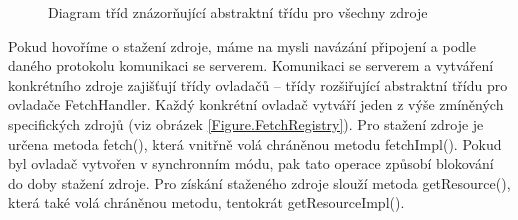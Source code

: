 \begin{figure}[H]
  \begin{center}
    \caption{Diagram tříd znázorňující abstraktní třídu pro všechny zdroje}
    \label{Figure.Resource}
  \end{center}
\end{figure}

Pokud hovoříme o stažení zdroje, máme na mysli navázání připojení a podle daného protokolu komunikaci se serverem. Komunikaci se serverem a vytváření konkrétního zdroje zajišťují třídy ovladačů -- třídy rozšiřující abstraktní třídu pro ovladače FetchHandler. Každý konkrétní ovladač vytváří jeden z výše zmíněných specifických zdrojů (viz obrázek \ref{Figure.FetchRegistry}). Pro stažení zdroje je určena metoda fetch(), která vnitřně volá chráněnou metodu fetchImpl(). Pokud byl ovladač vytvořen v synchronním módu, pak tato operace způsobí blokování do doby stažení zdroje. Pro získání staženého zdroje slouží metoda getResource(), která také volá chráněnou metodu, tentokrát getResourceImpl(). 

